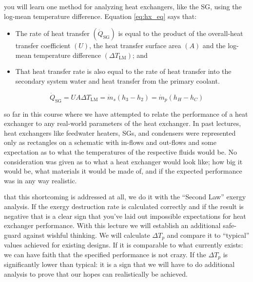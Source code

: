  you will learn one method for analyzing heat exchangers, like the SG, using the log-mean temperature difference. Equation \ref{eq:hx_eq} says that:
\begin{itemize}
\item The rate of heat transfer $(\dot{Q}_{\text{SG}})$ is equal to the product of the overall-heat transfer coefficient $(U)$, the heat transfer surface area $(A)$ and the log-mean temperature difference $(\Delta T_{\text{LM}})$; and
\item That heat transfer rate is also equal to the rate of heat transfer into the secondary system water and heat transfer from the primary coolant.
\end{itemize}

\begin{equation}
\dot{Q}_{\text{SG}} = UA\Delta T_{\text{LM}} = \dot{m}_s(h_3 - h_2) = \dot{m}_p(h_{H} - h_{C})
\label{eq:hx_eq}
\end{equation}


 so far in this course where we have attempted to relate the performance of a heat exchanger to any real-world parameters of the heat exchanger.  In past lectures, heat exchangers like feedwater heaters, SGs, and condensers were represented only as rectangles on a schematic with in-flows and out-flows and some expectation as to what the temperatures of the respective fluids would be.  No consideration was given as to what a heat exchanger would look like; how big it would be, what materials it would be made of, and if the expected performance was in any way realistic.

 that this shortcoming is addressed at all, we do it with the ``Second Law'' exergy analysis.  If the exergy destruction rate is calculated correctly and if the result is negative that is a clear sign that you've laid out impossible expectations for heat exchanger performance.  With this lecture we will establish an additional safe-guard against wishful thinking.  We will calculate $\Delta T_{p}$ and compare it to ``typical'' values achieved for existing designs.  If it is comparable to what currently exists: we can have faith that the specified performance is not crazy.  If the $\Delta T_{p}$ is significantly lower than typical: it is a sign that we will have to do additional analysis to prove that our hopes can realistically be achieved.

